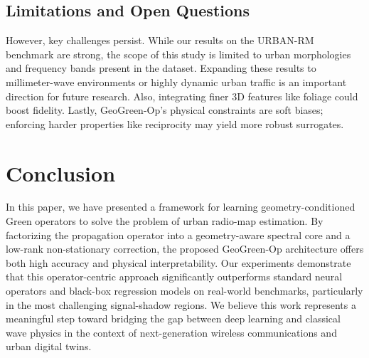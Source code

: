 \documentclass{article}
\begin{document}
\subsection{Limitations and Open Questions}
However, key challenges persist. While our results on the URBAN-RM benchmark are strong, the scope of this study is limited to urban morphologies and frequency bands present in the dataset. Expanding these results to millimeter-wave environments or highly dynamic urban traffic is an important direction for future research. Also, integrating finer 3D features like foliage could boost fidelity. Lastly, GeoGreen-Op's physical constraints are soft biases; enforcing harder properties like reciprocity may yield more robust surrogates.

\section{Conclusion}
\label{sec:conclusion}

In this paper, we have presented a framework for learning geometry-conditioned Green operators to solve the problem of urban radio-map estimation. By factorizing the propagation operator into a geometry-aware spectral core and a low-rank non-stationary correction, the proposed GeoGreen-Op architecture offers both high accuracy and physical interpretability. Our experiments demonstrate that this operator-centric approach significantly outperforms standard neural operators and black-box regression models on real-world benchmarks, particularly in the most challenging signal-shadow regions. We believe this work represents a meaningful step toward bridging the gap between deep learning and classical wave physics in the context of next-generation wireless communications and urban digital twins.






\end{document}
